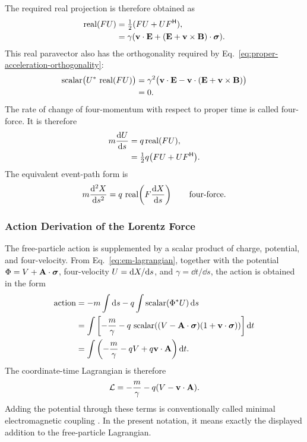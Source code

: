 The required real projection is therefore obtained as
\begin{align*}
\operatorname{real}( FU )
&= \tfrac{1}{2} ( FU + UF^{\mathsf H} ),\notag \\
&= \gamma (\mathbf{v} \cdot \mathbf{E} + ( \mathbf{E} + \mathbf{v} \times \mathbf{B} ) \cdot \mathbf{\bm{\sigma}} ).
\end{align*}
This real paravector also has the orthogonality required by
Eq.\ \eqref{eq:proper-acceleration-orthogonality}:
\begin{align*}
\operatorname{scalar}\bigl(U^{*}\,
\operatorname{real}(FU)\bigr)
&=\gamma^2\bigl(\mathbf{v}\cdot\mathbf{E}
-\mathbf{v}\cdot(\mathbf{E}+\mathbf{v}\times\mathbf{B})\bigr)\notag\\
&=0.
\end{align*}
The rate of change of four-momentum with respect to proper time is called
four-force. It is therefore
\begin{align*}
m\frac{\mathrm d U}{\mathrm d s}
&= q \operatorname{real}( FU ),\notag \\
&= \tfrac{1}{2} q \big( FU + UF^{\mathsf H} \big).
\end{align*}
The equivalent event-path form is
\begin{equation*}
m\frac{\dd^2\pv{X}}{\dd s^{2}}
=q\,\eqfunc{real}\!\left(\pv{F}\frac{\dd \pv{X}}{\dd s}\right)
\qquad \text{four-force}.
\end{equation*}

\subsubsection{Action Derivation of the Lorentz Force}
The free-particle action is supplemented by a scalar product of charge,
potential, and four-velocity. From Eq.\ \eqref{eq:em-lagrangian}, together
with the
potential \(\Phi=V+\mathbf{A}\cdot\mathbf{\bm{\sigma}}\), four-velocity
\(U=\mathrm d X/\mathrm d s\), and \(\gamma=\dd t/\dd s\), the action is
obtained in the form
\begin{align*}
\text{action}
&=-m\int\dd s-q\int\eqfunc{scalar}(\pv{\Phi}^*\pv{U})\,\dd s\notag\\
&=\int\left[-\frac{m}{\gamma}
-q\,\eqfunc{scalar}\!\left((V-\vct{A}\cdot\sigv)
(1+\vct{v}\cdot\sigv)\right)\right]\dd t\notag\\
&=\int\left(-\frac{m}{\gamma}-qV+q\vct{v}\cdot\vct{A}\right)\dd t.
\end{align*}
The coordinate-time Lagrangian is therefore
\begin{equation*}
\mathcal{L}=-\frac{m}{\gamma}-q(V-\mathbf{v}\cdot\mathbf{A}).
\end{equation*}
Adding the potential through these terms is conventionally called minimal
electromagnetic coupling \cite{jackson1998,greiner2000}. In the present
notation, it means exactly the displayed addition to the free-particle
Lagrangian.

